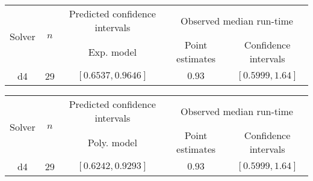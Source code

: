 \begin{tabular}{ccccc}
\hline 
\multirow{2}{*}{Solver} & \multirow{2}{*}{$n$} & Predicted confidence intervals & \multicolumn{2}{c}{Observed median  run-time}\tabularnewline
 &  & Exp. model  & Point estimates  & Confidence intervals\tabularnewline
\hline 
\hline 
\multirow{0}{*}{d4} & 29 & $\mathbf{\left[0.6537,0.9646\right]}$ & $0.93$ & $\left[0.5999,1.64\right]$ \tabularnewline 
\hline 
\end{tabular} 

\begin{tabular}{ccccc}
\hline 
\multirow{2}{*}{Solver} & \multirow{2}{*}{$n$} & Predicted confidence intervals & \multicolumn{2}{c}{Observed median  run-time}\tabularnewline
 &  & Poly. model  & Point estimates  & Confidence intervals\tabularnewline
\hline 
\hline 
\multirow{0}{*}{d4} & 29 & $\mathbf{\left[0.6242,0.9293\right]}$ & $0.93$ & $\left[0.5999,1.64\right]$ \tabularnewline 
\hline 
\end{tabular} 


